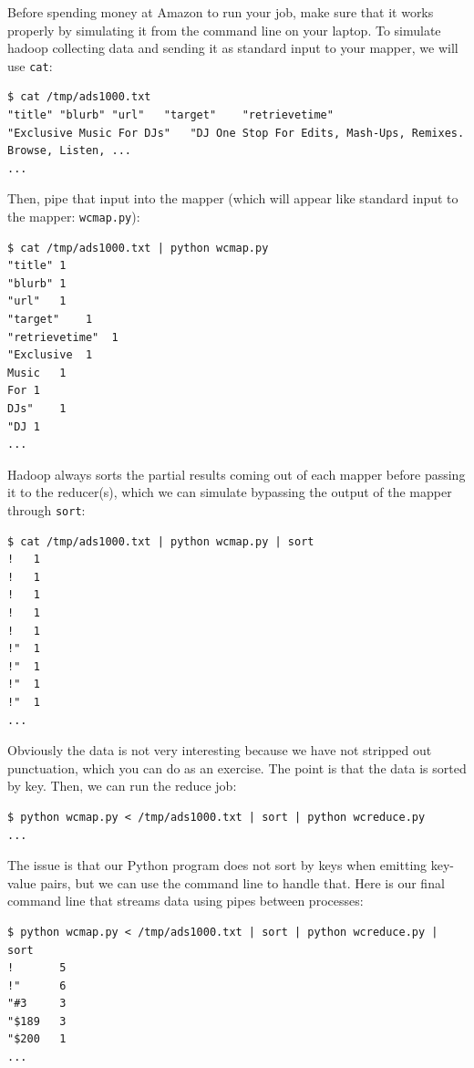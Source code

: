 \begin{fullwidth}
Before spending money at Amazon to run your job, make sure that it works properly by simulating it from the command line on your laptop. To simulate hadoop collecting data and sending it as standard input to your mapper, we will use {\tt cat}:

\begin{lstlisting}[style=BashInputStyle]
$ cat /tmp/ads1000.txt
"title"	"blurb"	"url"	"target"	"retrievetime"
"Exclusive Music For DJs"	"DJ One Stop For Edits, Mash-Ups, Remixes. Browse, Listen, ...
...
\end{lstlisting}

 Then, pipe that input into the mapper (which will appear like standard input to the mapper: {\tt wcmap.py}):

\begin{lstlisting}[style=BashInputStyle]
$ cat /tmp/ads1000.txt | python wcmap.py
"title"	1
"blurb"	1
"url"	1
"target"	1
"retrievetime"	1
"Exclusive	1
Music	1
For	1
DJs"	1
"DJ	1
...
\end{lstlisting}

\noindent Hadoop always sorts the partial results coming out of each mapper before passing it to the reducer(s), which we can simulate bypassing the output of the mapper through {\tt sort}:

\begin{lstlisting}[style=BashInputStyle]
$ cat /tmp/ads1000.txt | python wcmap.py | sort
!	1
!	1
!	1
!	1
!	1
!"	1
!"	1
!"	1
!"	1
...
\end{lstlisting}

\noindent Obviously the data is not very interesting because we have not stripped out punctuation, which you can do as an exercise.  The point is that the data is sorted by key. Then, we can run the reduce job:

\begin{lstlisting}[style=BashInputStyle]
$ python wcmap.py < /tmp/ads1000.txt | sort | python wcreduce.py
...
\end{lstlisting}

\noindent The issue is that our Python program does not sort by keys when emitting key-value pairs, but we can use the command line to handle that. Here is our final command line that streams data using pipes between processes:

\begin{lstlisting}[style=BashInputStyle]
$ python wcmap.py < /tmp/ads1000.txt | sort | python wcreduce.py | sort
!       5
!"      6
"#3     3
"$189   3
"$200   1
...
\end{lstlisting}


\end{fullwidth}
